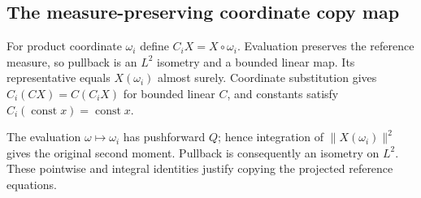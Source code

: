 \documentclass[11pt,a4paper]{report}
\begin{document}
\subsection{\texorpdfstring{The measure-preserving coordinate copy map}{The measure-preserving coordinate copy map}}
\label{report-step-ProximalLangevin-MeanFieldCopies-lean-1}


For product coordinate \(\omega_i\) define \(C_iX=X\circ\omega_i\). Evaluation preserves the reference measure, so pullback is an \(L^2\) isometry and a bounded linear map. Its representative equals \(X(\omega_i)\) almost surely. Coordinate substitution gives \(C_i(CX)=C(C_iX)\) for bounded linear \(C\), and constants satisfy \(C_i(\operatorname{const}x)=\operatorname{const}x\).



The evaluation \(\omega\mapsto\omega_i\) has pushforward \(Q\); hence integration of \(\|X(\omega_i)\|^2\) gives the original second moment. Pullback is consequently an isometry on \(L^2\). These pointwise and integral identities justify copying the projected reference equations.
\end{document}
